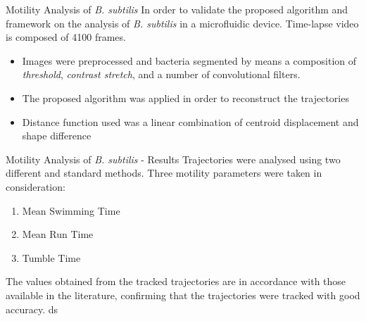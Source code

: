 \documentclass{beamer}
\begin{document}
  \begin{frame}{ Motility Analysis of \textit{B. subtilis}}
		In order to validate the proposed algorithm and framework on the analysis of \textit{B. subtilis} in a microfluidic device. Time-lapse video is composed of 4100 frames.
		
		\begin{itemize}
			\item Images were preprocessed and bacteria segmented by means a composition of \textit{threshold}, \textit{contrast stretch}, and a number of convolutional filters.
			\item The proposed algorithm was applied in order to reconstruct the trajectories 
			\item Distance function used was a linear combination of centroid displacement and shape difference
		\end{itemize}

		
\end{frame} %

  \begin{frame}{ Motility Analysis of \textit{B. subtilis} - Results}
Trajectories were analysed using two different and standard methods. Three motility parameters were taken in consideration:
\begin{enumerate}
\item Mean Swimming Time
\item Mean Run Time
\item Tumble Time
\end{enumerate}
The values obtained from the tracked trajectories are in accordance with those available in the literature, confirming that the trajectories were tracked with good accuracy.
ds

		
\end{frame} %
\end{document}
